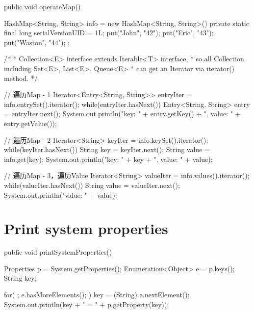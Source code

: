 \begin{javacode}
public void operateMap() {
  HashMap<String, String> info = new HashMap<String, String>() {
    private static final long serialVersionUID = 1L;
    {
      put("John", "42");
      put("Eric", "43");
      put("Waston", "44");
    }
  };

  /*
   * Collection<E> interface extends Iterable<T> interface,
   * so all Collection including Set<E>, List<E>, Queue<E>
   * can get an Iterator via iterator() method.
   */

  // 遍历Map - 1
  Iterator<Entry<String, String>> entryIter = info.entrySet().iterator();
  while(entryIter.hasNext()) {
    Entry<String, String> entry = entryIter.next();
    System.out.println("key: " + entry.getKey() + ", value: " + entry.getValue());
  }

  // 遍历Map - 2
  Iterator<String> keyIter = info.keySet().iterator();
  while(keyIter.hasNext()) {
    String key = keyIter.next();
    String value = info.get(key);
    System.out.println("key: " + key + ", value: " + value);
  }

  // 遍历Map - 3，遍历Value
  Iterator<String> valueIter = info.values().iterator();
  while(valueIter.hasNext()) {
    String value = valueIter.next();
    System.out.println("value: " + value);
  }
}
\end{javacode}

\section[Print system properties]{Print system properties}
\begin{javacode}
public void printSystemProperties() {
  Properties p = System.getProperties();
  Enumeration<Object> e = p.keys();
  String key;

  for( ; e.hasMoreElements(); ) {
    key = (String) e.nextElement();
    System.out.println(key + " = " + p.getProperty(key));
  }
}
\end{javacode}
